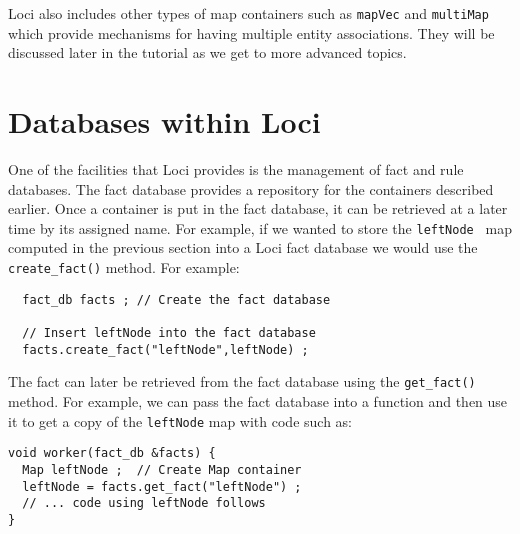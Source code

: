 \documentclass[10pt,epsf]{book}
\begin{document}
Loci also includes other types of map containers such as {\tt mapVec}
and {\tt multiMap} which provide mechanisms for having multiple entity
associations.  They will be discussed later in the tutorial as we get
to more advanced topics.

\section{Databases within Loci}

One of the facilities that Loci provides is the management of fact and
rule databases.  The fact database provides a repository for the
containers described earlier.  Once a container is put in the fact
database, it can be retrieved at a later time by its assigned name.  For example, if we wanted to store the {\tt leftNode } map computed in the previous section into a Loci fact database we would use the {\tt create\_fact()} method.  For example:
\begin{verbatim}
  fact_db facts ; // Create the fact database
  
  // Insert leftNode into the fact database
  facts.create_fact("leftNode",leftNode) ;
\end{verbatim}

The fact can later be retrieved from the fact database using the {\tt get\_fact()} method.  For example, we can pass the fact database into a function and then use it to get a copy of the {\tt leftNode} map with code such as:
\begin{verbatim}
void worker(fact_db &facts) {
  Map leftNode ;  // Create Map container
  leftNode = facts.get_fact("leftNode") ;
  // ... code using leftNode follows
}
\end{verbatim}
\end{document}
